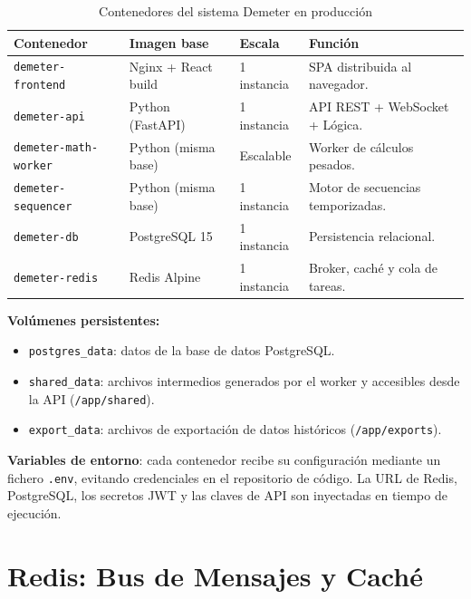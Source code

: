 \begin{table}[H]
    \centering
    \caption{Contenedores del sistema Demeter en producción}
    \begin{tabular}{lllp{5.8cm}}
        \toprule
        \textbf{Contenedor} & \textbf{Imagen base} & \textbf{Escala} & \textbf{Función} \\
        \midrule
        \texttt{demeter-frontend}   & Nginx + React build  & 1 instancia   & SPA distribuida al navegador. \\
        \texttt{demeter-api}        & Python (FastAPI)     & 1 instancia   & API REST + WebSocket + Lógica. \\
        \texttt{demeter-math-worker}& Python (misma base)  & Escalable     & Worker de cálculos pesados. \\
        \texttt{demeter-sequencer}  & Python (misma base)  & 1 instancia   & Motor de secuencias temporizadas. \\
        \texttt{demeter-db}         & PostgreSQL 15        & 1 instancia   & Persistencia relacional. \\
        \texttt{demeter-redis}      & Redis Alpine         & 1 instancia   & Broker, caché y cola de tareas. \\
        \bottomrule
    \end{tabular}
    \label{tab:docker_containers}
\end{table}

\textbf{Volúmenes persistentes:}
\begin{itemize}[leftmargin=*, label=--]
    \item \texttt{postgres\_data}: datos de la base de datos PostgreSQL. 
    \item \texttt{shared\_data}: archivos intermedios generados por el worker 
          y accesibles desde la API (\texttt{/app/shared}).
    \item \texttt{export\_data}: archivos de exportación de datos históricos 
          (\texttt{/app/exports}).
\end{itemize}

\textbf{Variables de entorno}: cada contenedor recibe su configuración mediante un fichero 
\texttt{.env}, evitando credenciales en el repositorio de código. La URL de Redis, PostgreSQL, 
los secretos JWT y las claves de API son inyectadas en tiempo de ejecución.


\section{Redis: Bus de Mensajes y Caché}

